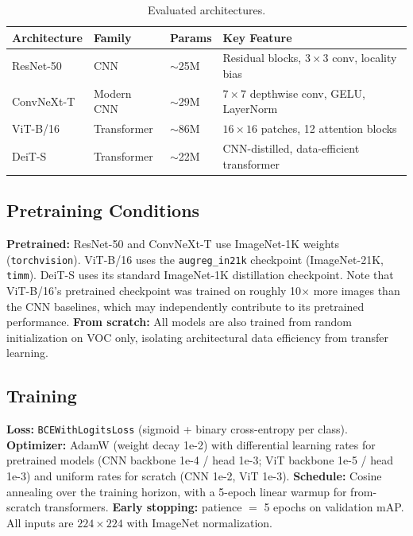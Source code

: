 \documentclass{article}
\begin{document}
\begin{table}[h]
\centering
\caption{Evaluated architectures.}
\smallskip
\begin{tabular}{llll}
\toprule
\textbf{Architecture} & \textbf{Family} & \textbf{Params} & \textbf{Key Feature} \\
\midrule
ResNet-50   & CNN         & $\sim$25M & Residual blocks, $3 \times 3$ conv, locality bias \\
ConvNeXt-T  & Modern CNN  & $\sim$29M & $7 \times 7$ depthwise conv, GELU, LayerNorm \\
ViT-B/16    & Transformer & $\sim$86M & $16 \times 16$ patches, 12 attention blocks \\
DeiT-S      & Transformer & $\sim$22M & CNN-distilled, data-efficient transformer \\
\bottomrule
\end{tabular}
\label{tab:architectures}
\end{table}

\subsection{Pretraining Conditions}

\textbf{Pretrained:} ResNet-50 and ConvNeXt-T use ImageNet-1K weights (\texttt{torchvision}). ViT-B/16 uses the \texttt{augreg\_in21k} checkpoint (ImageNet-21K, \texttt{timm}). DeiT-S uses its standard ImageNet-1K distillation checkpoint. Note that ViT-B/16's pretrained checkpoint was trained on roughly 10$\times$ more images than the CNN baselines, which may independently contribute to its pretrained performance. \textbf{From scratch:} All models are also trained from random initialization on VOC only, isolating architectural data efficiency from transfer learning.

\subsection{Training}

\textbf{Loss:} \texttt{BCEWithLogitsLoss} (sigmoid + binary cross-entropy per class). \textbf{Optimizer:} AdamW (weight decay 1e-2) with differential learning rates for pretrained models (CNN backbone 1e-4 / head 1e-3; ViT backbone 1e-5 / head 1e-3) and uniform rates for scratch (CNN 1e-2, ViT 1e-3). \textbf{Schedule:} Cosine annealing over the training horizon, with a 5-epoch linear warmup for from-scratch transformers. \textbf{Early stopping:} patience $=$ 5 epochs on validation mAP. All inputs are $224 \times 224$ with ImageNet normalization.
\end{document}

